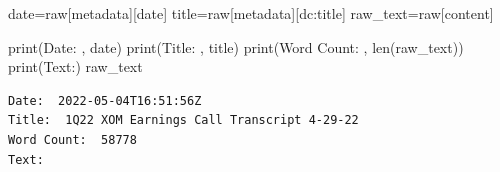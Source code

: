 \documentclass[
  letterpaper,
  DIV=11,
  numbers=noendperiod]{scrreprt}
\newenvironment{Shaded}{\begin{snugshade}}{\end{snugshade}}
\newcommand{\BuiltInTok}[1]{\textcolor[rgb]{0.00,0.23,0.31}{#1}}
\newcommand{\NormalTok}[1]{\textcolor[rgb]{0.00,0.23,0.31}{#1}}
\newcommand{\OperatorTok}[1]{\textcolor[rgb]{0.37,0.37,0.37}{#1}}
\newcommand{\StringTok}[1]{\textcolor[rgb]{0.13,0.47,0.30}{#1}}
\begin{document}
\begin{Shaded}
\begin{Highlighting}[]
\NormalTok{date}\OperatorTok{=}\NormalTok{raw[}\StringTok{\textquotesingle{}metadata\textquotesingle{}}\NormalTok{][}\StringTok{\textquotesingle{}date\textquotesingle{}}\NormalTok{]}
\NormalTok{title}\OperatorTok{=}\NormalTok{raw[}\StringTok{\textquotesingle{}metadata\textquotesingle{}}\NormalTok{][}\StringTok{\textquotesingle{}dc:title\textquotesingle{}}\NormalTok{]}
\NormalTok{raw\_text}\OperatorTok{=}\NormalTok{raw[}\StringTok{\textquotesingle{}content\textquotesingle{}}\NormalTok{]}

\BuiltInTok{print}\NormalTok{(}\StringTok{\textquotesingle{}Date: \textquotesingle{}}\NormalTok{, date)}
\BuiltInTok{print}\NormalTok{(}\StringTok{\textquotesingle{}Title: \textquotesingle{}}\NormalTok{, title)}
\BuiltInTok{print}\NormalTok{(}\StringTok{\textquotesingle{}Word Count: \textquotesingle{}}\NormalTok{, }\BuiltInTok{len}\NormalTok{(raw\_text))}
\BuiltInTok{print}\NormalTok{(}\StringTok{\textquotesingle{}Text:\textquotesingle{}}\NormalTok{)}
\NormalTok{raw\_text}
\end{Highlighting}
\end{Shaded}

\begin{verbatim}
Date:  2022-05-04T16:51:56Z
Title:  1Q22 XOM Earnings Call Transcript 4-29-22
Word Count:  58778
Text:
\end{verbatim}
\end{document}
